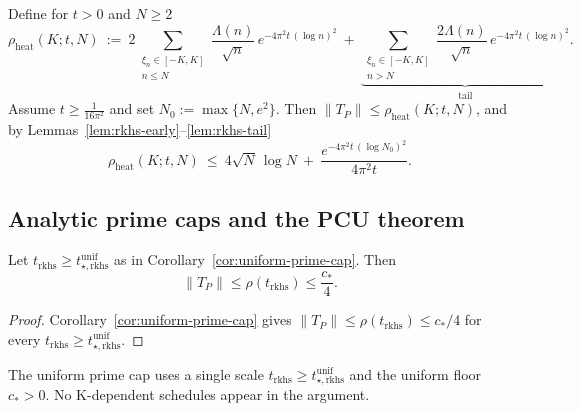 \begin{proposition}\label{prop:rkhs-early-tail-cap}
Define for $t>0$ and $N\ge2$
\[
\rho_{\mathrm{heat}}(K;t,N)\ :=\
2\sum_{\substack{\xi_n\in[-K,K]\\ n\le N}}\frac{\Lambda(n)}{\sqrt{n}}\,e^{-4\pi^2 t\,(\log n)^2}
\ +\ \underbrace{\sum_{\substack{\xi_n\in[-K,K]\\ n>N}}\frac{2\Lambda(n)}{\sqrt{n}}\,e^{-4\pi^2 t\,(\log n)^2}}_{\text{tail}}.
\]
Assume $t\ge \tfrac{1}{16\pi^2}$ and set $N_0:=\max\{N,e^2\}$. Then $\|T_P\|\le \rho_{\mathrm{heat}}(K;t,N)$, and by Lemmas~\ref{lem:rkhs-early}--\ref{lem:rkhs-tail}
\[
\rho_{\mathrm{heat}}(K;t,N)\ \le\ 4\sqrt{N}\,\log N\ +\ \frac{e^{-4\pi^2 t\,(\log N_0)^2}}{4\pi^2 t}.
\]
\end{proposition}

\subsection*{Analytic prime caps and the PCU theorem}

\begin{corollary}\label{cor:pcu-uniform}
Let $t_{\mathrm{rkhs}}\ge t_{\star,\mathrm{rkhs}}^{\mathrm{unif}}$ as in Corollary~\ref{cor:uniform-prime-cap}. Then
\[
  \|T_P\|\le \rho(t_{\mathrm{rkhs}})\le \frac{c_*}{4}.
\]
\end{corollary}

\begin{proof}
Corollary~\ref{cor:uniform-prime-cap} gives $\|T_P\|\le \rho(t_{\mathrm{rkhs}})\le c_*/4$ for every
$t_{\mathrm{rkhs}}\ge t_{\star,\mathrm{rkhs}}^{\mathrm{unif}}$.
\end{proof}

\begin{remark}
The uniform prime cap uses a single scale $t_{\mathrm{rkhs}}\ge t_{\star,\mathrm{rkhs}}^{\mathrm{unif}}$
and the uniform floor $c_*>0$. No K-dependent schedules appear in the argument.
\end{remark}
